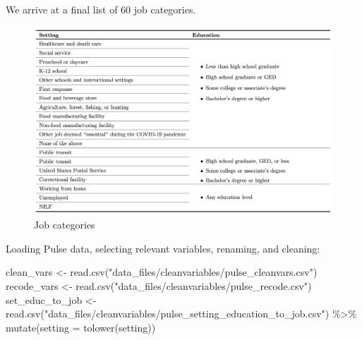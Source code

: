 \documentclass[
]{article}
\newenvironment{Shaded}{\begin{snugshade}}{\end{snugshade}}
\newcommand{\AttributeTok}[1]{\textcolor[rgb]{0.77,0.63,0.00}{#1}}
\newcommand{\FunctionTok}[1]{\textcolor[rgb]{0.00,0.00,0.00}{#1}}
\newcommand{\NormalTok}[1]{#1}
\newcommand{\OtherTok}[1]{\textcolor[rgb]{0.56,0.35,0.01}{#1}}
\newcommand{\SpecialCharTok}[1]{\textcolor[rgb]{0.00,0.00,0.00}{#1}}
\newcommand{\StringTok}[1]{\textcolor[rgb]{0.31,0.60,0.02}{#1}}
\begin{document}
We arrive at a final list of 60 job categories.

\begin{figure}
\centering
\includegraphics{"figures/job_categories.png"}
\caption{Job categories}
\end{figure}

Loading Pulse data, selecting relevant variables, renaming, and
cleaning:

\begin{Shaded}
\begin{Highlighting}[]
\NormalTok{clean\_vars }\OtherTok{\textless{}{-}} \FunctionTok{read.csv}\NormalTok{(}\StringTok{"data\_files/cleanvariables/pulse\_cleanvars.csv"}\NormalTok{)}
\NormalTok{recode\_vars }\OtherTok{\textless{}{-}} \FunctionTok{read.csv}\NormalTok{(}\StringTok{"data\_files/cleanvariables/pulse\_recode.csv"}\NormalTok{)}
\NormalTok{set\_educ\_to\_job }\OtherTok{\textless{}{-}} \FunctionTok{read.csv}\NormalTok{(}\StringTok{"data\_files/cleanvariables/pulse\_setting\_education\_to\_job.csv"}\NormalTok{) }\SpecialCharTok{\%\textgreater{}\%} \FunctionTok{mutate}\NormalTok{(}\AttributeTok{setting =} \FunctionTok{tolower}\NormalTok{(setting))}
\end{Highlighting}
\end{Shaded}
\end{document}
